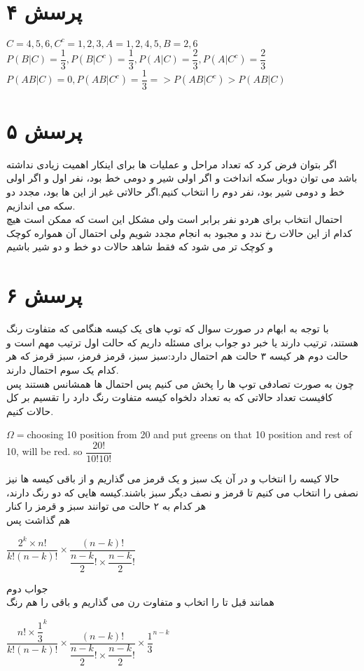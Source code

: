 \documentclass[a4paper]{article}
\begin{document}
\section*{پرسش ۴}
\begin{latin}
$ C = {4,5,6}, C^c = {1,2,3}, A={1,2,4,5}, B={2,6} $\\
$ P(B|C) = \dfrac{1}{3}, P(B|C^c)= \dfrac{1}{3}, P(A|C) = \dfrac{2}{3}, P(A|C^c)=\dfrac{2}{3}$\\
$ P(AB|C) = 0, P(AB|C^c) = \dfrac{1}{3} => P(AB|C^c) > P(AB|C)$
\end{latin}
\pagebreak

\section*{پرسش ۵}
اگر بتوان فرض کرد که تعداد مراحل و عملیات ها برای اینکار اهمیت زیادی نداشته باشد می توان دوبار سکه انداخت و اگر اولی شیر و دومی خط بود، نفر اول و اگر اولی خط و دومی شیر بود، نفر دوم را انتخاب کنیم.اگر حالاتی غیر از این ها بود، مجدد دو سکه می اندازیم.\\
 احتمال انتخاب برای هردو نفر برابر
است ولی مشکل این است که ممکن است هیچ کدام از این حالات رخ ندد و مجبود به انجام مجدد شویم ولی احتمال آن همواره کوچک و کوچک تر می شود که فقط شاهد حالات دو خط و دو شیر باشیم
\begin{latin}

\end{latin}

\pagebreak

\section*{پرسش ۶}
با توجه به ابهام در صورت سوال که توپ های یک کیسه هنگامی که متفاوت رنگ هستند، ترتیب دارند یا خبر دو جواب برای مسئله داریم که حالت اول ترتیب مهم است و حالت دوم هر کیسه ۳ حالت هم احتمال دارد:سبز سبز، قرمز فرمز، سبز قرمز که هر کدام یک سوم احتمال دارند.\\
چون به صورت تصادفی توپ ها را پخش می کنیم پس احتمال ها همشانس هستند پس کافیست تعداد حالاتی که به تعداد دلخواه کیسه متفاوت رنگ دارد را تقسیم بر کل حالات کنیم.
\begin{latin}
$\Omega = $choosing 10 position from 20 and put greens on that 10 position and rest of 10, will be red. so $\dfrac{20!}{10!10!}$\\
\end{latin}
حالا 
کیسه را انتخاب و در آن یک سبز و یک قرمز می گذاریم و از باقی کیسه ها نیز نصفی را انتخاب می کنیم تا قرمز و نصف دیگر سبز باشند.کیسه هایی که دو رنگ دارند، هر کدام به ۲ حالت می توانند سبز و قرمز را کنار \\هم گذاشت پس
\begin{latin}
$\dfrac{2^k \times n!}{k!(n-k)!} \times \dfrac{ (n-k)!}{\dfrac{n-k}{2}! \times \dfrac{n-k}{2}!}$
\end{latin}
جواب دوم\\
همانند قبل 
تا را اتخاب و متفاوت رن می گذاریم و باقی را هم رنگ\\
\begin{latin}
$\dfrac{n! \times \dfrac{1}{3}^k}{k!(n-k)!} \times \dfrac{ (n-k)! }{\dfrac{n-k}{2}! \times \dfrac{n-k}{2}!}\times \dfrac{1}{3}^{n-k}$
\end{latin}
\pagebreak
\end{document}
